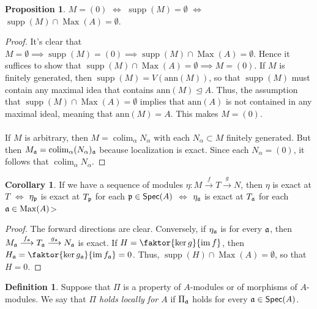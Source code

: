 \documentclass[10pt,letterpaper,cm]{nupset}
\theoremstyle{definition}
\newtheorem*{definition}{Definition}
\newtheorem{prop}{Proposition}
\newtheorem{corollary}{Corollary}
\newcommand{\1}{\mathbf{1}}
\newcommand{\0}{\vec 0}
\DeclareMathOperator{\im}{im}
\DeclareMathOperator{\colim}{colim}
\DeclareMathOperator{\Max}{Max}
\DeclareMathOperator{\supp}{supp}
\begin{document}
\begin{prop}
$M= (0)$ $\iff$ $\supp(M) = \emptyset$ $\iff$ $\supp(M) \cap \Max(A) = \emptyset$.
\end{prop}
\begin{proof}
It's clear that $M = \emptyset \implies \supp(M) = (0) \implies \supp(M) \cap \Max(A) = \emptyset$. Hence it suffices to show that  $\supp(M) \cap \Max(A) = \emptyset \implies M= (0)$. If $M$ is finitely generated, then $\supp(M) = V(\text{ann}(M))$, so that $\supp(M)$ must contain any maximal idea that contains $\text{ann}(M) \unlhd A$. Thus, the assumption that $\supp(M) \cap \Max(A) = \emptyset$ implies that $\text{ann}(A)$ is not contained in any maximal ideal, meaning that $\text{ann}(M) = A$. This makes $M= (0)$. 
\\ \\
If $M$ is arbitrary, then $M = \colim_{\alpha} N_{\alpha}$ with each $N_{\alpha} \subset M$ finitely generated. But then $M_{\frak{a}} = \colim_{\alpha} (N_{\alpha})_{\frak{a}}$ because localization is exact.  Since each $N_{\alpha} = (0)$, it follows that $\colim_{\alpha} N_{\alpha}$. 
\end{proof}


\begin{corollary}
If we have a sequence of modules $\eta: M \overset{f}{\longrightarrow} T \overset{g}{\longrightarrow} N$, then $\eta$ is exact at $T$ $\iff$ $\eta_{\frak{p}}$ is exact at $T_{\frak{p}}$ for each $\frak{p} \in \mathsf{Spec}(A)$ $\iff$ $\eta_{\frak{a}}$ is exact at $T_{\frak{a}}$ for each $\frak{a} \in \Max(A)$>  
\end{corollary}
\begin{proof}
The forward directions are clear. Conversely, if $\eta_{\frak{a}}$ is for every $\frak{a}$, then $M_{\frak{a}} \overset{f_{\frak{a}}}{\longrightarrow} T_{\frak{a}} \overset{g_{\frak{a}}}{\longrightarrow} N_{\frak{a}}$ is exact. If $H = \faktor{\ker{g}}{\im{f}}$, then $H_{\frak{a}} = \faktor{\ker{g_{\frak{a}}}}{\im{f_{\frak{a}}}} = 0$. Thus, $\supp(H) \cap \Max(A) = \emptyset$, so that $H= 0$. 
\end{proof}

\begin{definition}
Suppose that $\Pi$ is a property of $A$-modules or of morphisms of $A$-modules. We say that \textit{$\Pi$ holds locally for $A$} if $\Pi_{\frak{a}}$ holds for every $\frak{a} \in \mathsf{Spec}(A)$.  
\end{definition}
\end{document}
